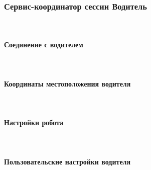 \subsubsection{Сервис-координатор сессии Водитель} \mbox{} \\ \label{}

	\paragraph{Соединение с водителем} \mbox{} \\ \label{}

	\paragraph{Координаты местоположения водителя} \mbox{} \\ \label{}

	\paragraph{Настройки робота} \mbox{} \\ \label{}

	\paragraph{Пользовательские настройки водителя} \mbox{} \\ \label{server_driver_user_settings}